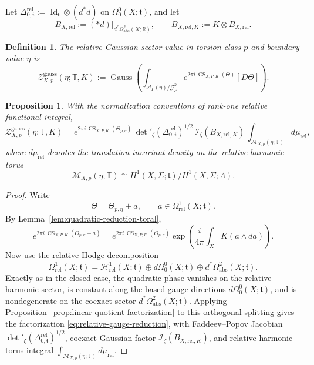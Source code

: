 \documentclass[12pt]{amsart}
\numberwithin{equation}{section}
\newtheorem{prop}[theorem]{Proposition}
\newtheorem{definition}[theorem]{Definition}
\begin{document}
Let $\Delta^{\mathrm{rel}}_{0,\mathfrak t}
:=
\operatorname{Id}_{\mathfrak t}\otimes (d^*d)$ on \(\Omega^0_0(X;\mathfrak t)\), and let
\[
B_{X,\mathrm{rel}}
:=
(*d)\big|_{d^*\Omega^2_{\mathrm{abs}}(X;\mathbb R)},
\qquad
B_{X,\mathrm{rel},K}
:=
K\otimes B_{X,\mathrm{rel}}.
\]

\begin{definition}
\label{def:relative-gaussian-sector}
The \emph{relative Gaussian sector value} in torsion class \(p\) and boundary value \(\eta\) is
\[
\mathcal Z^{\mathrm{gauss}}_{X,p}(\eta;\mathbb T,K)
:=
\operatorname{Gauss}\!\left(
\int_{\mathcal A_P(\eta)/\mathcal G_P^\partial}
e^{2\pi i\,\operatorname{CS}_{X,P,K}(\Theta)}[D\Theta]
\right).
\]
\end{definition}

\begin{prop}
\label{prop:relative-gauge-reduction}
With the normalization conventions of  rank-one relative functional integral,
\begin{equation}
\label{eq:relative-gauge-reduction}
\mathcal Z^{\mathrm{gauss}}_{X,p}(\eta;\mathbb T,K)
=
e^{2\pi i\,\operatorname{CS}_{X,P,K}(\Theta_{p,\eta})}\,
\det\nolimits'_{\zeta}(\Delta^{\mathrm{rel}}_{0,\mathfrak t})^{1/2}\,
\mathcal I_\zeta(B_{X,\mathrm{rel},K})\,
\int_{\mathcal M_{X,p}(\eta;\mathbb T)} d\mu_{\mathrm{rel}},
\end{equation}
where \(d\mu_{\mathrm{rel}}\) denotes the translation-invariant density on the relative harmonic torus
\[
\mathcal M_{X,p}(\eta;\mathbb T)
\cong
H^1(X,\Sigma;\mathfrak t)/H^1(X,\Sigma;\Lambda).
\]
\end{prop}

\begin{proof}
Write
\[
\Theta=\Theta_{p,\eta}+a,
\qquad
a\in \Omega^1_{\mathrm{rel}}(X;\mathfrak t).
\]
By Lemma~\ref{lem:quadratic-reduction-toral},
\[
e^{2\pi i\,\operatorname{CS}_{X,P,K}(\Theta_{p,\eta}+a)}
=
e^{2\pi i\,\operatorname{CS}_{X,P,K}(\Theta_{p,\eta})}
\exp\!\left(\frac{i}{4\pi}\int_X K(a\wedge da)\right).
\]
Now use the relative Hodge decomposition
\[
\Omega^1_{\mathrm{rel}}(X;\mathfrak t)
=
\mathcal H^1_{\mathrm{rel}}(X;\mathfrak t)
\oplus
d\Omega^0_0(X;\mathfrak t)
\oplus
d^*\Omega^2_{\mathrm{abs}}(X;\mathfrak t).
\]
Exactly as in the closed case, the quadratic phase vanishes on the relative harmonic
sector, is constant along the based gauge directions \(d\Omega^0_0(X;\mathfrak t)\), and
is nondegenerate on the coexact sector \(d^*\Omega^2_{\mathrm{abs}}(X;\mathfrak t)\).
Applying Proposition~\ref{prop:linear-quotient-factorization} to this orthogonal splitting
gives the factorization \eqref{eq:relative-gauge-reduction}, with Faddeev--Popov Jacobian
\(\det\nolimits'_{\zeta}(\Delta^{\mathrm{rel}}_{0,\mathfrak t})^{1/2}\), coexact Gaussian factor
\(\mathcal I_\zeta(B_{X,\mathrm{rel},K})\), and relative harmonic torus integral $\int_{\mathcal M_{X,p}(\eta;\mathbb T)} d\mu_{\mathrm{rel}}.$
\end{proof}
\end{document}
